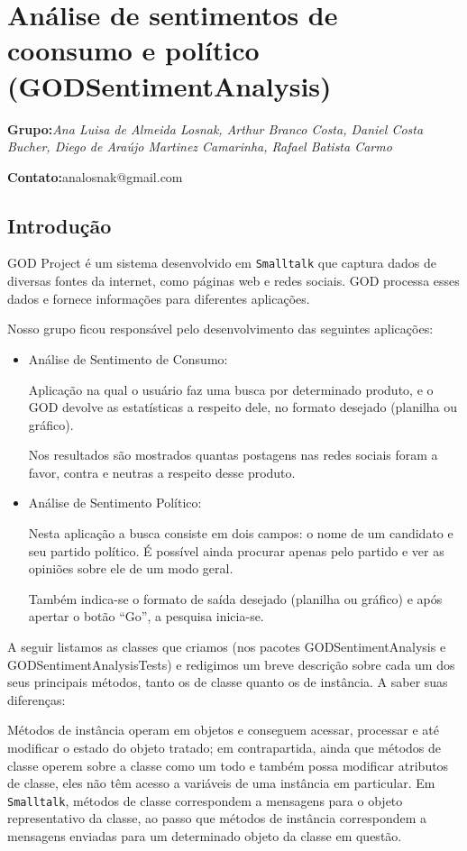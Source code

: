 \section{Análise de sentimentos de coonsumo e político (GODSentimentAnalysis)}

\textbf{Grupo:}\textit{Ana Luisa de Almeida Losnak, Arthur Branco Costa, Daniel Costa Bucher, Diego de Araújo Martinez Camarinha, Rafael Batista Carmo}

\textbf{Contato:}analosnak@gmail.com


\subsection{Introdução}
GOD Project é um sistema desenvolvido em \texttt{Smalltalk} que captura dados de diversas fontes da internet, como páginas web e redes sociais. GOD processa esses dados e fornece informações para diferentes aplicações.

Nosso grupo ficou responsável pelo desenvolvimento das seguintes aplicações:

\begin{itemize}
	\item Análise de Sentimento de Consumo:
	
	Aplicação na qual o usuário faz uma busca por determinado produto, e o GOD devolve as estatísticas a respeito dele, no formato desejado (planilha ou gráfico).
	
	Nos resultados são mostrados quantas postagens nas redes sociais foram a favor, contra e neutras a respeito desse produto.
	
	\item Análise de Sentimento Político:
	
	Nesta aplicação a busca consiste em dois campos: o nome de um candidato e seu partido político. É possível ainda procurar apenas pelo partido e ver as opiniões sobre ele de um modo geral.

	Também indica-se o formato de saída desejado (planilha ou gráfico) e após apertar o botão ``Go'', a pesquisa inicia-se.
\end{itemize}


A seguir listamos as classes que criamos (nos pacotes GODSentimentAnalysis e GODSentimentAnalysisTests) e redigimos um breve descrição sobre cada um dos seus principais métodos, tanto os de classe quanto os de instância. A saber suas diferenças:

Métodos de instância operam em objetos e conseguem acessar, processar e até modificar o estado do objeto tratado; em contrapartida, ainda que métodos de classe operem sobre a classe como um todo e também possa modificar atributos de classe, eles não têm acesso a variáveis de uma instância em particular. Em \texttt{Smalltalk}, métodos de classe correspondem a mensagens para o objeto representativo da classe, ao passo que métodos de instância correspondem a mensagens enviadas para um determinado objeto da classe em questão.

